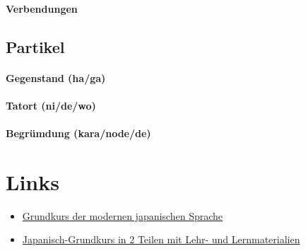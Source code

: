 \documentclass[justified, a4paper, notitlepage, captions=tableheading, nobib]{tufte-handout}
\begin{document}
\paragraph{Verbendungen}
\label{sec:org6a706ac}

\subsection{Partikel }
\label{sec:org67b332c}

\paragraph{Gegenstand (ha/ga)}
\label{sec:org25fd989}

\paragraph{Tatort (ni/de/wo)}
\label{sec:org7d9a05e}

\paragraph{Begrümdung (kara/node/de)}
\label{sec:org5ff46a0}

\section{Links}
\label{sec:org9b2a761}

\begin{itemize}
\item \href{https://www-user.tu-chemnitz.de/\~heha/j/buchtext/Index.htm}{Grundkurs der modernen japanischen Sprache}
\item \href{https://omp.ub.rub.de/index.php/RUB/catalog/book/31}{Japanisch-Grundkurs in 2 Teilen mit Lehr- und Lernmaterialien}
\end{itemize}

\newpage

\nocite{*}
\printbibliography
{}
\end{document}

